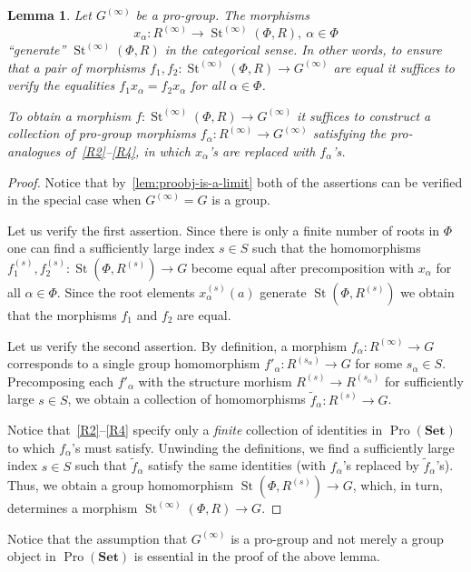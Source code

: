 \documentclass[oneside, 11pt]{amsart}
\numberwithin{equation}{section}
\newtheorem{lemma}{Lemma} \numberwithin{lemma}{section}
\theoremstyle{definition}
\theoremstyle{remark}
\DeclareMathOperator\St{St}
\DeclareMathOperator{\Pro}{Pro}
\newcommand{\Set}{\mathbf{Set}}
\begin{document}
\begin{lemma}\label{SteinbergPresentation}
Let \(G^{(\infty)}\) be a pro-group. The morphisms \[x_{\alpha} \colon R^{(\infty)} \to \St^{(\infty)}(\Phi, R), \ \alpha\in \Phi\] ``generate'' $\St^{(\infty)}(\Phi, R)$ in the categorical sense. In other words, to ensure that a pair of morphisms $f_1,f_2\colon\St^{(\infty)}(\Phi, R) \to G^{(\infty)}$ are equal it suffices to verify the equalities $f_1 x_{\alpha} = f_2 x_\alpha$ for all $\alpha\in\Phi$.

To obtain a morphism $f \colon \St^{(\infty)}(\Phi, R) \to G^{(\infty)}$ it suffices to construct a collection of pro-group morphisms \(f_{\alpha} \colon R^{(\infty)} \to G^{(\infty)}\) satisfying the pro-analogues of~\eqref{R2}--\eqref{R4}, in which $x_\alpha$'s are replaced with $f_{\alpha}$'s.
\end{lemma}
\begin{proof}
Notice that by~\cref{lem:proobj-is-a-limit} both of the assertions can be verified in the special case when $G^{(\infty)} = G$ is a group.

Let us verify the first assertion. Since there is only a finite number of roots in $\Phi$ one can find a sufficiently large index $s \in S$ such that the homomorphisms $f_1^{(s)}, f_2^{(s)}\colon \St(\Phi, R^{(s)}) \to G$ become equal after precomposition with $x_\alpha$ for all $\alpha \in \Phi$.
Since the root elements $x_\alpha^{(s)}(a)$ generate $\St(\Phi, R^{(s)})$ we obtain that the morphisms $f_1$ and $f_2$ are equal.

Let us verify the second assertion. By definition, a morphism $f_\alpha \colon R^{(\infty)} \to G$ corresponds to a single group homomorphism 
 $f'_\alpha \colon R^{(s_\alpha)} \to G$ for some $s_\alpha \in S$. Precomposing each $f'_\alpha$ with the structure morhism $R^{(s)} \to R^{(s_\alpha)}$ for sufficiently large $s \in S$, we obtain a collection of homomorphisms $\widetilde{f}_\alpha \colon R^{(s)} \to G$.
 
Notice that~\eqref{R2}--\eqref{R4} specify only a {\it finite} collection of identities in $\Pro(\Set)$ to which $f_\alpha$'s must satisfy.
Unwinding the definitions, we find a sufficiently large index $s \in S$ such that $\widetilde{f}_\alpha$ satisfy the same identities (with $f_\alpha$'s replaced by $\widetilde{f}_\alpha$'s).
Thus, we obtain a group homomorphism $\St(\Phi, R^{(s)}) \to G$, which, in turn, determines a morphism $\St^{(\infty)}(\Phi, R) \to G$.
\end{proof}
Notice that the assumption that $G^{(\infty)}$ is a pro-group and not merely a group object in $\Pro(\Set)$ is essential in the proof of the above lemma.
\end{document}
